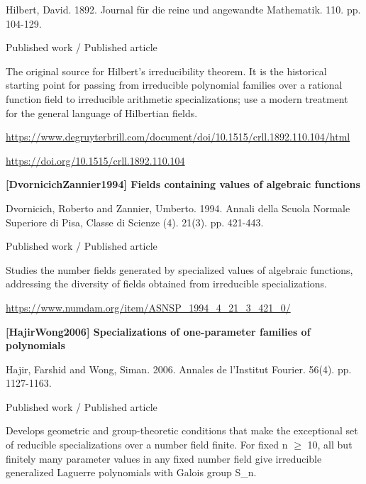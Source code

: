 \documentclass[11pt,a4paper,oneside,openany]{book}
\begin{document}
\color{black} Hilbert, David. 1892. Journal für die reine und angewandte Mathematik. 110. pp. 104-129.\par
{\small\sffamily\color{atlasgold}Published work / Published article}\par
\color{black} The original source for Hilbert's irreducibility theorem. It is the historical starting point for passing from irreducible polynomial families over a rational function field to irreducible arithmetic specializations; use a modern treatment for the general language of Hilbertian fields.\par
{\footnotesize\url{https://www.degruyterbrill.com/document/doi/10.1515/crll.1892.110.104/html}}\par
{\footnotesize\url{https://doi.org/10.1515/crll.1892.110.104}}\par
\vspace{9pt}
\hypertarget{ref:DvornicichZannier1994}{}
{\sffamily\bfseries\color{atlasgreen}[DvornicichZannier1994] Fields containing values of algebraic functions}\par
\color{black} Dvornicich, Roberto and Zannier, Umberto. 1994. Annali della Scuola Normale Superiore di Pisa, Classe di Scienze (4). 21(3). pp. 421-443.\par
{\small\sffamily\color{atlasgold}Published work / Published article}\par
\color{black} Studies the number fields generated by specialized values of algebraic functions, addressing the diversity of fields obtained from irreducible specializations.\par
{\footnotesize\url{https://www.numdam.org/item/ASNSP_1994_4_21_3_421_0/}}\par
\vspace{9pt}
\hypertarget{ref:HajirWong2006}{}
{\sffamily\bfseries\color{atlasgreen}[HajirWong2006] Specializations of one-parameter families of polynomials}\par
\color{black} Hajir, Farshid and Wong, Siman. 2006. Annales de l'Institut Fourier. 56(4). pp. 1127-1163.\par
{\small\sffamily\color{atlasgold}Published work / Published article}\par
\color{black} Develops geometric and group-theoretic conditions that make the exceptional set of reducible specializations over a number field finite. For fixed n \ensuremath{\ge} 10, all but finitely many parameter values in any fixed number field give irreducible generalized Laguerre polynomials with Galois group S\_\allowbreak{}n.\par
\end{document}

